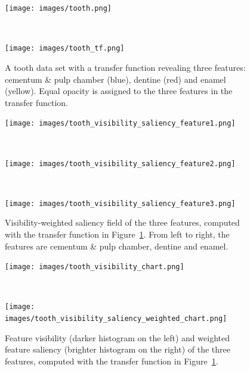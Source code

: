\begin{figure}
	\centering
	\begin{minipage}{.2\textwidth}
		\texttt{[image: images/tooth.png]}
	\end{minipage}~
	\begin{minipage}{.1\textwidth}
		\texttt{[image: images/tooth\_tf.png]}
	\end{minipage}
	\caption{A tooth data set with a transfer function revealing three features: cementum \& pulp chamber (blue), dentine (red) and enamel (yellow). Equal opacity is assigned to the three features in the transfer function.}
	\label{fig:tooth}
\end{figure}

\begin{figure}
	\centering
	\begin{minipage}{.15\textwidth}
		\texttt{[image: images/tooth\_visibility\_saliency\_feature1.png]}
	\end{minipage}~
	\begin{minipage}{.15\textwidth}
		\texttt{[image: images/tooth\_visibility\_saliency\_feature2.png]}
	\end{minipage}~
	\begin{minipage}{.15\textwidth}
		\texttt{[image: images/tooth\_visibility\_saliency\_feature3.png]}
	\end{minipage}
	\caption{Visibility-weighted saliency field of the three features, computed with the transfer function in Figure~\ref{fig:tooth}. From left to right, the features are cementum \& pulp chamber, dentine and enamel.}
	\label{fig:tooth_saliency_field}
\end{figure}

\begin{figure}
	\centering
	\begin{minipage}{.2\textwidth}
		\texttt{[image: images/tooth\_visibility\_chart.png]}
	\end{minipage}~
	\begin{minipage}{.2\textwidth}
		\texttt{[image: images/tooth\_visibility\_saliency\_weighted\_chart.png]}
	\end{minipage}
	\caption{Feature visibility (darker histogram on the left) and weighted feature saliency (brighter histogram on the right) of the three features, computed with the transfer function in Figure~\ref{fig:tooth}.}
	\label{fig:tooth_saliency_chart}
\end{figure}

